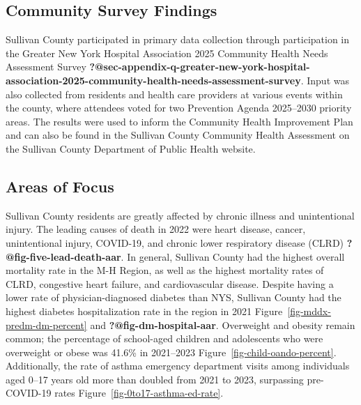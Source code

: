 \documentclass[
  english,
  letterpaper,
]{report}
\begin{document}
\subsection{Community Survey
Findings}\label{community-survey-findings-4}

Sullivan County participated in primary data collection through
participation in the Greater New York Hospital Association 2025
Community Health Needs Assessment Survey
\textbf{?@sec-appendix-q-greater-new-york-hospital-association-2025-community-health-needs-assessment-survey}.
Input was also collected from residents and health care providers at
various events within the county, where attendees voted for two
Prevention Agenda 2025--2030 priority areas. The results were used to
inform the Community Health Improvement Plan and can also be found in
the Sullivan County Community Health Assessment on the Sullivan County
Department of Public Health website.

\subsection{Areas of Focus}\label{areas-of-focus-4}

Sullivan County residents are greatly affected by chronic illness and
unintentional injury. The leading causes of death in 2022 were heart
disease, cancer, unintentional injury, COVID-19, and chronic lower
respiratory disease (CLRD) \textbf{?@fig-five-lead-death-aar}. In
general, Sullivan County had the highest overall mortality rate in the
M-H Region, as well as the highest mortality rates of CLRD, congestive
heart failure, and cardiovascular disease. Despite having a lower rate
of physician-diagnosed diabetes than NYS, Sullivan County had the
highest diabetes hospitalization rate in the region in 2021
Figure~\ref{fig-mddx-predm-dm-percent} and
\textbf{?@fig-dm-hospital-aar}. Overweight and obesity remain common;
the percentage of school-aged children and adolescents who were
overweight or obese was 41.6\% in 2021--2023
Figure~\ref{fig-child-oando-percent}. Additionally, the rate of asthma
emergency department visits among individuals aged 0--17 years old more
than doubled from 2021 to 2023, surpassing pre-COVID-19 rates
Figure~\ref{fig-0to17-asthma-ed-rate}.
\end{document}
